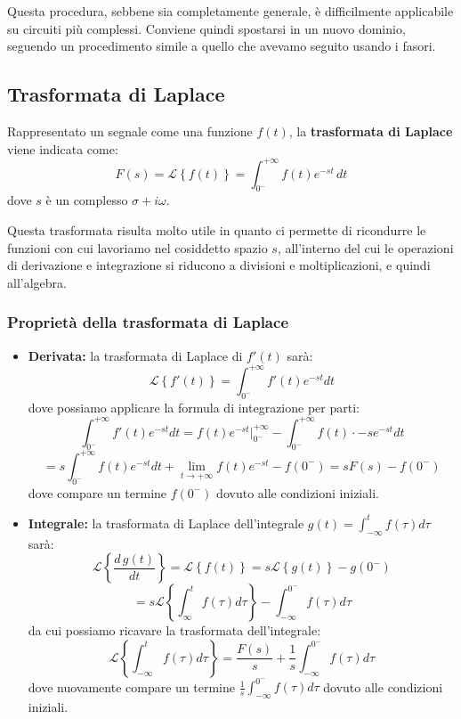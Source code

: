 \documentclass[a4paper,11pt]{article}
\begin{document}
Questa procedura, sebbene sia completamente generale, è difficilmente applicabile su circuiti più complessi.
Conviene quindi spostarsi in un nuovo dominio, seguendo un procedimento simile a quello che avevamo seguito usando i fasori.

\subsection{Trasformata di Laplace}
Rappresentato un segnale come una funzione $f(t)$, la \textbf{trasformata di Laplace} viene indicata come:
$$
F(s) = \mathcal{L} \left\{ f(t) \right\} = \int_{0^-}^{+\infty} f(t)e^{-st} \, dt
$$
dove $s$ è un complesso $\sigma + i \omega$.

Questa trasformata risulta molto utile in quanto ci permette di ricondurre le funzioni con cui lavoriamo nel cosiddetto spazio $s$, all'interno del cui le operazioni di derivazione e integrazione si riducono a divisioni e moltiplicazioni, e quindi all'algebra.

\subsubsection{Proprietà della trasformata di Laplace}

\begin{itemize}
	\item \textbf{Derivata:} la trasformata di Laplace di $f'(t)$ sarà:
		$$
		\mathcal{L}\left\{ f'(t) \right\} = \int_{0^-}^{+\infty} f'(t) e^{-st} dt	
		$$
		dove possiamo applicare la formula di integrazione per parti:
		$$ 
		\int_{0^-}^{+\infty} f'(t) e^{-st} dt = f(t) e^{-st} \Big|_{0^-}^{+\infty} - \int_{0^-}^{+\infty} f(t) \cdot -s e^{-st} dt 
		$$
		$$
		= s \int_{0^-}^{+\infty} f(t) e^{-st} dt + \lim_{t \rightarrow +\infty} f(t)e^{-st} - f(0^-) = s F(s) - f(0^-)
		$$
		dove compare un termine $f(0^-)$ dovuto alle condizioni iniziali.
\item \textbf{Integrale:} la trasformata di Laplace dell'integrale $g(t) = \int_{-\infty}^t f(\tau) d\tau$ sarà:
		$$
		\mathcal{L}\left\{ \frac{d\,g(t)}{dt} \right\} = \mathcal{L}\left\{ f(t) \right\} = s \mathcal{L}\left\{ g(t) \right\} - g(0^-) 
		$$
		$$
		=  s \mathcal{L}\left\{ \int_\infty^t f(\tau) d\tau \right\} - \int_{-\infty}^{0^-} f(\tau) d\tau
		$$
		da cui possiamo ricavare la trasformata dell'integrale:
		$$
		\mathcal{L}\left\{ \int_{-\infty}^t f(\tau) d\tau \right\} = \frac{F(s)}{s} + \frac{1}{s} \int_{-\infty}^{0^-} f(\tau) d \tau
		$$
dove nuovamente compare un termine $\frac{1}{s} \int_{-\infty}^{0^-} f(\tau) d \tau$ dovuto alle condizioni iniziali.
\end{itemize}
\end{document}
